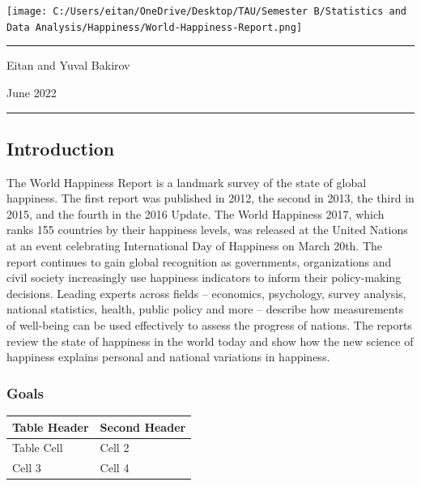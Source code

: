 \documentclass[
]{article}
\author{Eitan \& Yuval Bakirov}
\date{2022-06-09}
\begin{document}
\texttt{[image: C:/Users/eitan/OneDrive/Desktop/TAU/Semester B/Statistics and Data Analysis/Happiness/World-Happiness-Report.png]}

\begin{center}\rule{0.5\linewidth}{0.5pt}\end{center}

Eitan and Yuval Bakirov

June 2022

\begin{center}\rule{0.5\linewidth}{0.5pt}\end{center}

\hfill\break

\hypertarget{introduction}{%
\subsection{Introduction}\label{introduction}}

The World Happiness Report is a landmark survey of the state of global
happiness. The first report was published in 2012, the second in 2013,
the third in 2015, and the fourth in the 2016 Update. The World
Happiness 2017, which ranks 155 countries by their happiness levels, was
released at the United Nations at an event celebrating International Day
of Happiness on March 20th. The report continues to gain global
recognition as governments, organizations and civil society increasingly
use happiness indicators to inform their policy-making decisions.
Leading experts across fields -- economics, psychology, survey analysis,
national statistics, health, public policy and more -- describe how
measurements of well-being can be used effectively to assess the
progress of nations. The reports review the state of happiness in the
world today and show how the new science of happiness explains personal
and national variations in happiness.

\hfill\break

\hypertarget{goals}{%
\subsubsection{Goals}\label{goals}}

\begin{longtable}[]{@{}ll@{}}
\toprule
Table Header & Second Header \\
\midrule
\endhead
Table Cell & Cell 2 \\
Cell 3 & Cell 4 \\
\bottomrule
\end{longtable}
\end{document}
